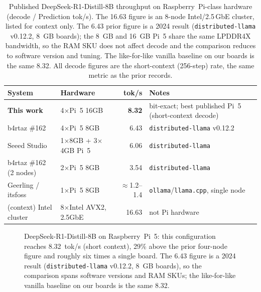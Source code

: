 \documentclass[10pt,a4paper]{article}
\begin{document}
\begin{table}[H]
\centering\small\setlength{\tabcolsep}{4pt}
\caption{Published DeepSeek-R1-Distill-8B throughput on Raspberry~Pi-class hardware (decode / Prediction tok/s). The 16.63 figure is an 8-node Intel/2.5\,GbE cluster, listed for context only. The 6.43 prior figure is a 2024 result (\texttt{distributed-llama} v0.12.2, 8~GB boards); the 8~GB and 16~GB Pi~5 share the same LPDDR4X bandwidth, so the RAM SKU does not affect decode and the comparison reduces to software version and tuning. The like-for-like vanilla baseline on our boards is the same 8.32. All decode figures are the short-context (256-step) rate, the same metric as the prior records.}
\label{tab:records}
\begin{tabularx}{\textwidth}{p{4.6cm}p{3.2cm}r X}
\toprule
\textbf{System} & \textbf{Hardware} & \textbf{tok/s} & \textbf{Notes} \\
\midrule
\textbf{This work} & 4$\times$Pi~5 16GB & \textbf{8.32} & bit-exact; best published Pi~5 (short-context decode) \\
b4rtaz \#162 \citep{dllama162} & 4$\times$Pi~5 8GB & 6.43 & \texttt{distributed-llama} v0.12.2 \\
Seeed Studio \citep{seeed2025} & 1$\times$8GB + 3$\times$4GB Pi~5 & 6.06 & \texttt{distributed-llama} \\
b4rtaz \#162 (2 nodes) & 2$\times$Pi~5 8GB & 3.54 & \texttt{distributed-llama} \\
Geerling / itsfoss \citep{geerling2025} & 1$\times$Pi~5 8GB & $\approx$1.2--1.4 & \texttt{ollama}/\texttt{llama.cpp}, single node \\
\midrule
(context) Intel cluster \citep{dllama162} & 8$\times$Intel AVX2, 2.5GbE & 16.63 & not Pi hardware \\
\bottomrule
\end{tabularx}
\end{table}

\begin{figure}[H]
\centering
{}
\caption{DeepSeek-R1-Distill-8B on Raspberry~Pi~5: this configuration reaches 8.32~tok/s (short context), 29\% above the prior four-node figure and roughly six times a single board. The 6.43 figure is a 2024 result (\texttt{distributed-llama} v0.12.2, 8~GB boards), so the comparison spans software versions and RAM SKUs; the like-for-like vanilla baseline on our boards is the same 8.32.}
\label{fig:records}
\end{figure}
\end{document}
